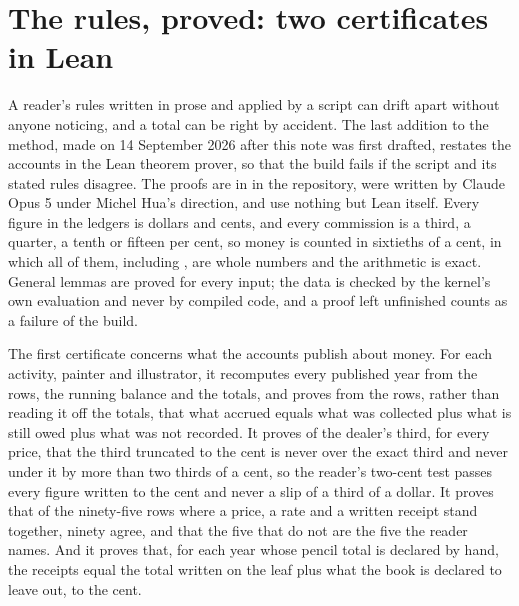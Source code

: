 \section{The rules, proved: two certificates in Lean}

A reader's rules written in prose and applied by a script can drift apart without anyone noticing, and a total can be right by accident. The last addition to the method, made on 14 September 2026 after this note was first drafted, restates the accounts in the Lean theorem prover, so that the build fails if the script and its stated rules disagree. The proofs are in  in the repository, were written by Claude Opus 5 under Michel Hua's direction, and use nothing but Lean itself. Every figure in the ledgers is dollars and cents, and every commission is a third, a quarter, a tenth or fifteen per cent, so money is counted in sixtieths of a cent, in which all of them, including , are whole numbers and the arithmetic is exact. General lemmas are proved for every input; the data is checked by the kernel's own evaluation and never by compiled code, and a proof left unfinished counts as a failure of the build.

The first certificate concerns what the accounts publish about money. For each activity, painter and illustrator, it recomputes every published year from the rows, the running balance and the totals, and proves from the rows, rather than reading it off the totals, that what accrued equals what was collected plus what is still owed plus what was not recorded. It proves of the dealer's third, for every price, that the third truncated to the cent is never over the exact third and never under it by more than two thirds of a cent, so the reader's two-cent test passes every figure written to the cent and never a slip of a third of a dollar. It proves that of the ninety-five rows where a price, a rate and a written receipt stand together, ninety agree, and that the five that do not are the five the reader names. And it proves that, for each year whose pencil total is declared by hand, the receipts equal the total written on the leaf plus what the book is declared to leave out, to the cent.


